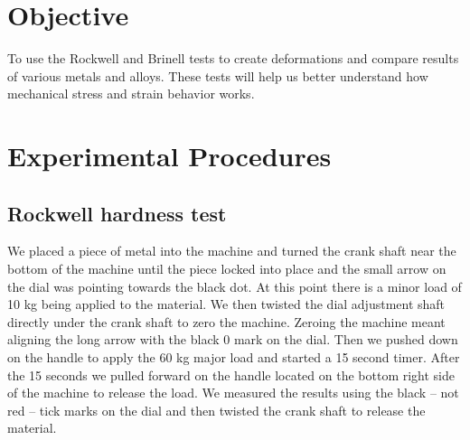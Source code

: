 \documentclass{article}
\begin{document}



\section{Objective}

To use the Rockwell and Brinell tests to create deformations and compare results of various metals and alloys. These tests will help us better understand how mechanical stress and strain behavior works.


\section{Experimental Procedures}
\subsection{Rockwell hardness test}
We placed a piece of metal into the machine and turned the crank shaft near the bottom of the machine until the piece locked into place and the small arrow on the dial was pointing towards the black dot. At this point there is a minor load of 10 kg being applied to the material. We then twisted the dial adjustment shaft directly under the crank shaft to zero the machine. Zeroing the machine meant aligning the long arrow with the black 0 mark on the dial. Then we pushed down on the handle to apply the 60 kg major load and started a 15 second timer. After the 15 seconds we pulled forward on the handle located on the bottom right side of the machine to release the load. We measured the results using the black – not red – tick marks on the dial and then twisted the crank shaft to release the material.
\end{document}
